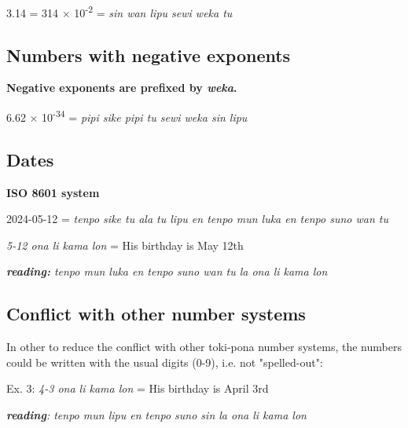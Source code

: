 \documentclass{article}
\begin{document}
		\vspace{5pt}
		
	3.14 = 314 × 10\textsuperscript{-2} = \emph{sin wan lipu sewi weka tu}
	
	\subsection{Numbers with negative exponents}
	
	\textbf{Negative exponents are prefixed by \textit{weka}.}

		\vspace{5pt}
	
	6.62 × 10\textsuperscript{-34} = \emph{pipi sike pipi tu sewi weka sin
		lipu}
	
	\subsection{Dates}
	
	\textbf{ISO 8601 system}
	\vspace{5pt}
	
	2024-05-12 = \emph{tenpo sike tu ala tu lipu en tenpo mun luka en tenpo
		suno wan tu}
	
	\vspace{5pt}
	
	
	\emph{5-12 ona li kama lon} = His birthday is May 12th
	
	\vspace{5pt}
	
	\emph{\textbf{reading:} tenpo mun luka en tenpo suno wan tu la ona li kama lon}

	\vspace{5pt}
	
	{\huge{}}
	
	
	\subsection{Conflict with other number systems}

\vspace{5pt}


In other to reduce the conflict with other toki-pona number systems, the numbers could be written with the usual digits (0-9), i.e. not "spelled-out":

	\vspace{5pt}

Ex. 3: \emph{4-3 ona li kama lon} = His birthday is April 3rd

	\vspace{5pt}

\emph{\textbf{reading}: tenpo mun lipu en tenpo suno sin la ona li kama lon}

\huge{}
	
	
	
\end{document}

